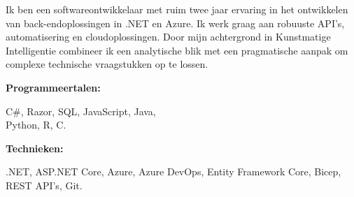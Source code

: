 \documentclass[9pt]{developercv} %
\begin{document}
\begin{minipage}[t]{0.46\textwidth}
    Ik ben een softwareontwikkelaar met ruim twee jaar ervaring in het ontwikkelen van back-endoplossingen in .NET en Azure. Ik werk graag aan robuuste API's, automatisering en cloudoplossingen. Door mijn achtergrond in Kunstmatige Intelligentie combineer ik een analytische blik met een pragmatische aanpak om complexe technische vraagstukken op te lossen. \\
\end{minipage}
\hfill %
\begin{minipage}[t]{0.465\textwidth}
    \vspace{-6pt}
    
    \begin{minipage}[t]{0.375\textwidth}
        \textbf{Programmeertalen:}
    \end{minipage}
    \hfill
    \begin{minipage}[t]{0.73\textwidth}
    C\#, Razor, SQL, JavaScript, Java, \\ Python, R, C.
    \end{minipage}
    \vspace{4mm}
    \begin{minipage}[t]{0.2\textwidth}
        \textbf{Technieken:}
    \end{minipage}
    \hfill
    \begin{minipage}[t]{0.73\textwidth}
      .NET, ASP.NET Core, Azure, Azure DevOps, Entity Framework Core, Bicep, REST API's, Git.
    \end{minipage}
    
\end{minipage}

\end{document}
